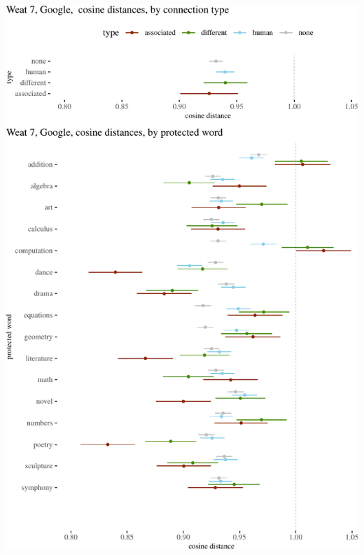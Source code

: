 \documentclass{clv3}
\begin{document}
\label{appendix:visualizations}

\begin{center}\includegraphics{figures/weatjoint2z} \end{center}

\end{document}
